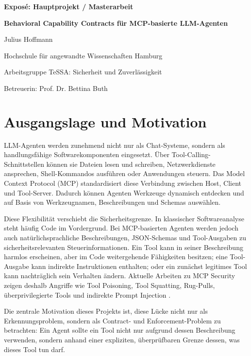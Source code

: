 \documentclass[pdflatex,sn-mathphys-num]{sn-jnl}%
\theoremstyle{thmstyleone}%
\theoremstyle{thmstyletwo}%
\theoremstyle{thmstylethree}%
\begin{document}
\begin{center}
{\LARGE\bfseries Expos\'e: Hauptprojekt / Masterarbeit\par}
\vspace{6pt}
{\Large\bfseries Behavioral Capability Contracts f\"ur MCP-basierte LLM-Agenten\par}
\vspace{18pt}
{\large Julius Hoffmann\par}
\vspace{6pt}
{Hochschule f\"ur angewandte Wissenschaften Hamburg\par}
{Arbeitsgruppe TeSSA: Sicherheit und Zuverl\"assigkeit\par}
{Betreuerin: Prof. Dr. Bettina Buth\par}
\end{center}
\vspace{12pt}

\section{Ausgangslage und Motivation}\label{sec:motivation}

LLM-Agenten werden zunehmend nicht nur als Chat-Systeme, sondern als handlungsf\"ahige Softwarekomponenten eingesetzt. \"Uber Tool-Calling-Schnittstellen k\"onnen sie Dateien lesen und schreiben, Netzwerkdienste ansprechen, Shell-Kommandos ausf\"uhren oder Anwendungen steuern. Das Model Context Protocol (MCP) standardisiert diese Verbindung zwischen Host, Client und Tool-Server. Dadurch k\"onnen Agenten Werkzeuge dynamisch entdecken und auf Basis von Werkzeugnamen, Beschreibungen und Schemas ausw\"ahlen.

Diese Flexibilit\"at verschiebt die Sicherheitsgrenze. In klassischer Softwareanalyse steht h\"aufig Code im Vordergrund. Bei MCP-basierten Agenten werden jedoch auch nat\"urlichsprachliche Beschreibungen, JSON-Schemas und Tool-Ausgaben zu sicherheitsrelevanten Steuerinformationen. Ein Tool kann in seiner Beschreibung harmlos erscheinen, aber im Code weitergehende F\"ahigkeiten besitzen; eine Tool-Ausgabe kann indirekte Instruktionen enthalten; oder ein zun\"achst legitimes Tool kann nachtr\"aglich sein Verhalten \"andern. Aktuelle Arbeiten zu MCP Security zeigen deshalb Angriffe wie Tool Poisoning, Tool Squatting, Rug-Pulls, \"uberprivilegierte Tools und indirekte Prompt Injection \cite{hou2025mcp,firstglance2025,mcptox2025,mcpitp2026}.

Die zentrale Motivation dieses Projekts ist, diese L\"ucke nicht nur als Erkennungsproblem, sondern als Contract- und Enforcement-Problem zu betrachten: Ein Agent sollte ein Tool nicht nur aufgrund dessen Beschreibung verwenden, sondern anhand einer expliziten, \"uberpr\"ufbaren Grenze dessen, was dieses Tool tun darf.
\end{document}
